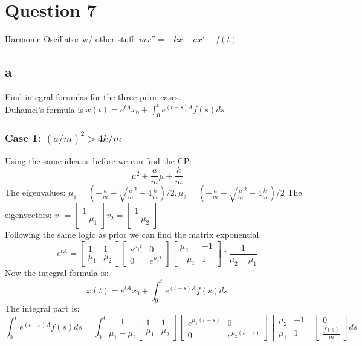 \documentclass{article}
\begin{document}
\section*{Question 7}
Harmonic Oscillator w/ other stuff: $mx'' = - kx - ax' + f(t)$
\subsection*{a}
Find integral forumlas for the three prior cases.\\
Duhamel's formula is $x(t) = e^{tA}x_0 + \int_0^t e^{(t-s)A}f(s)ds$\\
\subsubsection*{Case 1: $(a/m)^2 > 4k/m $}
Using the same idea as before we can find the CP: 
$$ \mu^2 + \frac{a}{m}\mu + \frac{k}{m}$$
The eigenvalues: $\mu_1 = (-\frac{a}{m} + \sqrt{\frac{a}{m}^2 - 4\frac{k}{m}} )/2 , \mu_2 = (-\frac{a}{m} - \sqrt{\frac{a}{m}^2 - 4\frac{k}{m}} )/2 $
The eigenvectors: $ v_1 = \begin{bmatrix}
    1 \\
    -\mu_1
\end{bmatrix} v_2 =\begin{bmatrix}
    1 \\
    -\mu_2
\end{bmatrix}$ \\
Following the same logic as prior we can find the matrix exponential.   
$$ e^{tA} = \begin{bmatrix}
    1 & 1\\
    \mu_1 & \mu_2
\end{bmatrix} \begin{bmatrix}
    e^{\mu_1 t} & 0\\
    0 & e^{\mu_2 t} 
\end{bmatrix} \begin{bmatrix}
        \mu_2 & -1\\
        -\mu_1 & 1
\end{bmatrix} * \frac{1}{\mu_2 - \mu_1}$$
Now the integral formula is:
$$ x(t) = e^{tA}x_0 + \int_0^t e^{(t-s)A}f(s)ds$$
The integral part is:
$$  \int_0^t e^{(t-s)A}f(s) ds = \int_0^t \frac{1}{\mu_1 - \mu_2}  \begin{bmatrix}
    1 & 1\\
    \mu_1 & \mu_2
\end{bmatrix} \begin{bmatrix}
    e^{\mu_1 (t-s)} & 0\\
    0 & e^{\mu_2 (t-s)} 
\end{bmatrix} \begin{bmatrix}
        \mu_2 & -1\\
        \mu_1 & 1
\end{bmatrix}
\begin{bmatrix}
            0\\
            \frac{f(s)}{m}
\end{bmatrix} ds $$
\end{document}
